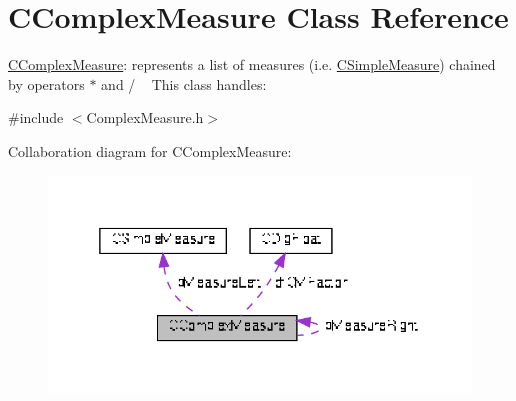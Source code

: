 \hypertarget{classCComplexMeasure}{}\section{C\+Complex\+Measure Class Reference}
\label{classCComplexMeasure}


\hyperlink{classCComplexMeasure}{C\+Complex\+Measure}\+: represents a list of measures (i.\+e. \hyperlink{classCSimpleMeasure}{C\+Simple\+Measure}) chained by operators $\ast$ and / ~\newline
 This class handles\+:  




{\ttfamily \#include $<$Complex\+Measure.\+h$>$}



Collaboration diagram for C\+Complex\+Measure\+:\nopagebreak
\begin{figure}[H]
\begin{center}
\leavevmode
\includegraphics[width=325pt]{d6/d10/classCComplexMeasure__coll__graph}
\end{center}
\end{figure}

